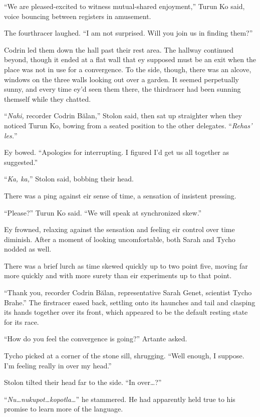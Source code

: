 ``We are pleased-excited to witness mutual-shared enjoyment,'' Turun Ko said, voice bouncing between registers in amusement.

The fourthracer laughed. ``I am not surprised. Will you join us in finding them?''

Codrin led them down the hall past their rest area. The hallway continued beyond, though it ended at a flat wall that ey supposed must be an exit when the place was not in use for a convergence. To the side, though, there was an alcove, windows on the three walls looking out over a garden. It seemed perpetually sunny, and every time ey'd seen them there, the thirdracer had been sunning themself while they chatted.

``\emph{Nahi,} recorder Codrin Bălan,'' Stolon said, then sat up straighter when they noticed Turun Ko, bowing from a seated position to the other delegates. ``\emph{Rehas' les.}''

Ey bowed. ``Apologies for interrupting. I figured I'd get us all together as suggested.''

``\emph{Ka, ka,}'' Stolon said, bobbing their head.

There was a ping against eir sense of time, a sensation of insistent pressing.

``Please?'' Turun Ko said. ``We will speak at synchronized skew.''

Ey frowned, relaxing against the sensation and feeling eir control over time diminish. After a moment of looking uncomfortable, both Sarah and Tycho nodded as well.

There was a brief lurch as time skewed quickly up to two point five, moving far more quickly and with more surety than eir experiments up to that point.

``Thank you, recorder Codrin Bălan, representative Sarah Genet, scientist Tycho Brahe.'' The firstracer eased back, settling onto its haunches and tail and clasping its hands together over its front, which appeared to be the default resting state for its race.

``How do you feel the convergence is going?'' Artante asked.

Tycho picked at a corner of the stone sill, shrugging. ``Well enough, I suppose. I'm feeling really in over my head.''

Stolon tilted their head far to the side. ``In over\ldots?''

``\emph{Nu\ldots nukupot\ldots kopotla\ldots{}}'' he stammered. He had apparently held true to his promise to learn more of the language.

